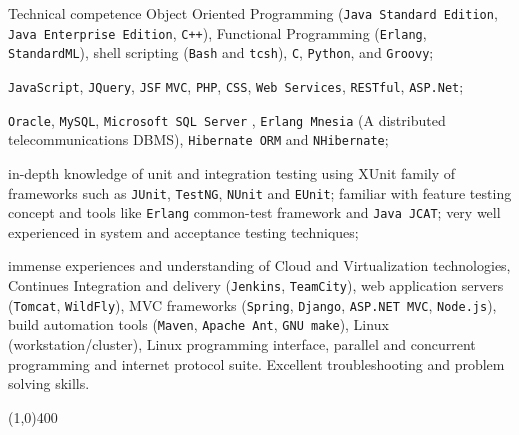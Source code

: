 \documentclass{resume}
\begin{document}
\begin{category}{Technical competence}
\hspace{1 mm}Object Oriented Programming 
(\texttt{Java Standard Edition}, \texttt{Java Enterprise Edition}, \texttt{C++}), 
Functional Programming (\texttt{Erlang}, \texttt{StandardML}), 
shell scripting (\texttt{Bash} and \texttt{tcsh}), \texttt{C}, \texttt{Python}, 
and \texttt{Groovy};

\hspace{1 mm}\texttt{JavaScript}, \texttt{JQuery}, \texttt{JSF} 
\texttt{MVC}, \texttt{PHP}, \texttt{CSS}, \texttt{Web Services}, \texttt{RESTful}, \texttt{ASP.Net};

\hspace{1 mm}\texttt{Oracle}, \texttt{MySQL}, \texttt{Microsoft SQL Server} 
, \texttt{Erlang Mnesia} (A distributed telecommunications DBMS), \texttt{Hibernate ORM} and \texttt{NHibernate};

\hspace{1 mm}in-depth knowledge of unit and integration 
testing using XUnit family of frameworks such as \texttt{JUnit}, \texttt{TestNG}, \texttt{NUnit} 
and \texttt{EUnit}; familiar with feature testing concept and tools like \texttt{Erlang} common-test 
framework and \texttt{Java JCAT}; very well experienced in system and acceptance testing techniques;

\hspace{1 mm}immense experiences and understanding of Cloud and Virtualization technologies, 
Continues Integration and delivery (\texttt{Jenkins}, \texttt{TeamCity}), 
web application servers (\texttt{Tomcat}, \texttt{WildFly}), 
MVC frameworks (\texttt{Spring}, \texttt{Django}, \texttt{ASP.NET MVC}, \texttt{Node.js}), 
build automation tools (\texttt{Maven}, \texttt{Apache Ant}, \texttt{GNU make}), Linux (workstation/cluster), 
Linux programming interface, parallel and concurrent programming and internet protocol suite.
Excellent troubleshooting and problem solving skills.

\end{category}

\begin{center}
\line(1,0){400}
\end{center}
\end{document}
